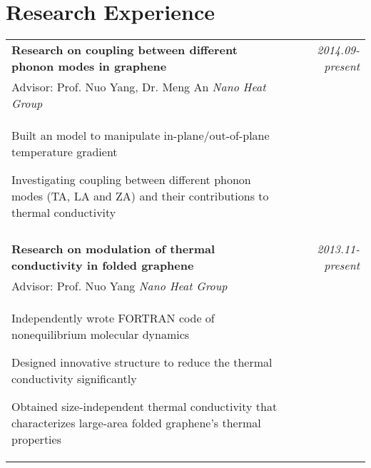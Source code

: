 \documentclass[a4paper,10pt]{article}
\begin{document}
\section{Research Experience}
\begin{tabular}{p{13.5cm}p{0.5cm}r}
\textbf{Research on coupling between different phonon modes in graphene} && \emph{2014.09-present} \\
\hspace{1em} Advisor: Prof. Nuo Yang, Dr. Meng An \hspace{3em} \emph{Nano Heat Group} && \vspace{-0.5em}\\
\begin{compactitem}
       \item Built an model to manipulate in-plane/out-of-plane temperature gradient\vspace{0.2em}
       \item Investigating coupling between different phonon modes (TA, LA and ZA) and their contributions to thermal conductivity\vspace{0.2em}
     \end{compactitem}&&\vspace{-2.2em} \\
\multicolumn{3}{c}{} \\
\textbf{Research on modulation of thermal conductivity in folded graphene} && \emph{2013.11-present} \\
\hspace{1em} Advisor: Prof. Nuo Yang \hspace{9em} \emph{Nano Heat Group} && \vspace{-0.5em}\\
\begin{compactitem}
       \item Independently wrote FORTRAN code of nonequilibrium molecular dynamics\vspace{0.2em}
       \item Designed innovative structure to reduce the thermal conductivity significantly\vspace{0.2em}
       \item Obtained size-independent thermal conductivity that characterizes large-area folded graphene's thermal properties
     \end{compactitem}&&\vspace{-2.2em} \\

\end{tabular}
\end{document}

